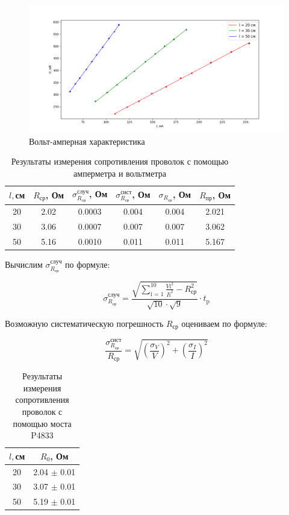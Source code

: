 \documentclass[a4paper,12pt]{article}
\begin{document}
\begin{figure}[H]
\centering
\includegraphics[scale = 0.5]{графики}
\caption{Вольт-амперная характеристика}
\end{figure}

\begin{table}[H]
\caption{Результаты измерения сопротивления проволок с помощью амперметра и вольтметра}
\begin{tabular}{|c|c|c|c|c|c|}
\hline
$l, $см & $R_{\mbox{ср}}$, Ом & $\sigma_{R_{\mbox{ср}}}^{\mbox{случ}}$, Ом & $\sigma_{R_{\mbox{ср}}}^{\mbox{сист}}$, Ом & $\sigma_{R_{\mbox{ср}}}$, Ом & $R_{\mbox{пр}}$, Ом\\
\hline
20 & 2.02 & 0.0003 & 0.004 & 0.004 & 2.021\\
\hline
30 & 3.06 & 0.0007 & 0.007 & 0.007 & 3.062\\
\hline
50 & 5.16 & 0.0010 & 0.011 & 0.011 & 5.167\\
\hline
\end{tabular}
\end{table}

Вычислим $\sigma_{R_{\mbox{ср}}}^{\mbox{случ}}$ по формуле:

\begin{equation}
\sigma_{R_{\mbox{ср}}}^{\mbox{случ}}=\frac{\sqrt{\sum_{\mbox{i = 1}}^{10}{\frac{V{\mbox{i}}^2}{I{\mbox{i}}^2}}-R_{\mbox{ср}}^2}}{\sqrt{10} \cdot \sqrt{9}} \cdot t_{\mbox{p}}
\end{equation}

Возможную систематическую погрешность $R_{\mbox{ср}}$ оцениваем по формуле:

\begin{equation}
\frac{\sigma_{R_{\mbox{ср}}}^{\mbox{сист}}}{R_{\mbox{ср}}}=\sqrt{\left( \frac{\sigma_V}{V} \right)^2+\left( \frac{\sigma_I}{I} \right)^2}
\end{equation}

\begin{table}[H]
\caption{Результаты измерения сопротивления проволок с помощью моста P4833}
\begin{tabular}{|c|c|}
\hline
$l, $см & $R_0$, Ом \\
\hline
20 & 2.04 $\pm$ 0.01 \\
\hline
30 & 3.07 $\pm$ 0.01 \\
\hline
50 & 5.19 $\pm$ 0.01 \\
\hline
\end{tabular}
\end{table}
\end{document}
